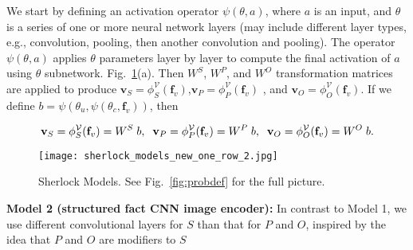 \documentclass[runningheads]{llncs}
\begin{document}
We start by defining an activation operator $\psi(\theta, a)$, where $a$ is an input, and $\theta$ is a series of one or more neural network layers (may include different layer types, e.g.,  convolution,  pooling, then another convolution and pooling). The operator $\psi(\theta, a)$ applies $\theta$  parameters layer by layer to compute the final activation of $a$ using $\theta$  subnetwork. %
Fig.~\ref{fig:mdls2}(a). 
Then $W^S$,  $W^P$, and $W^O$ transformation matrices are applied to produce $\mathbf{v}_S = \phi_S^\mathcal{V}(\mathbf{f}_v)$,$\mathbf{v}_P =\phi_P^\mathcal{V}(\mathbf{f}_v)$ , and $\mathbf{v}_O =\phi_O^\mathcal{V}(\mathbf{f}_v)$. If we define $b = \psi( \theta_u, \psi(\theta_c, \mathbf{f}_v))$, then 
\begin{comment}
\begin{equation}
\small
\begin{split}
&\phi_S^\mathcal{V}(\mathbf{f}_v) =  W^S \psi( \theta_u, \psi(\theta_c, \mathbf{f}_v)),  
\phi_P^\mathcal{V}(\mathbf{f}_v) =  W^P\psi( \theta_u, \psi(\theta_c, \mathbf{f}_v)), \\ &  
\phi_O^\mathcal{V}(\mathbf{f}_v) =  W^O\psi( \theta_u, \psi(\theta_c, \mathbf{f}_v))
\end{split}
\label{eq_mdl1}
\end{equation}
\begin{equation}
\small
b = \psi( \theta_v^u, \psi(\theta_v^c, \mathbf{f}_v)), \;\;
 \phi_S^\mathcal{V}(\mathbf{f}_v) =  W_v^S \; b,  \;\;
\phi_P^\mathcal{V}(\mathbf{f}_v) =  W_v^P \; b,   \;\;
\phi_O^\mathcal{V}(\mathbf{f}_v) =  W_v^O \; b.
\label{eq_mdl1}
\end{equation}
\end{comment}\begin{equation}
\small
\mathbf{v}_S = \phi_S^\mathcal{V}(\mathbf{f}_v) =  W^S \; b,  \;\;
\mathbf{v}_P= \phi_P^\mathcal{V}(\mathbf{f}_v) =  W^P \; b,   \;\;
\mathbf{v}_O= \phi_O^\mathcal{V}(\mathbf{f}_v) =  W^O \; b.
\label{eq_mdl1}
\end{equation}\begin{figure}[t!]
\begin{center}
\vspace{-10mm}
 \texttt{[image: sherlock\_models\_new\_one\_row\_2.jpg]}
\end{center}
 \vspace{-4mm}
 \caption{Sherlock Models. See Fig.~\ref{fig:probdef} for the full picture.} 
 \vspace{-5mm}
\label{fig:mdls2}
\end{figure}\vspace{-1mm}\noindent\textbf{Model 2 (structured fact CNN image encoder): } In contrast to Model 1, we use different convolutional layers for $S$ than that for $P$ and $O$, inspired by the idea that $P$ and $O$ are modifiers to $S$%
\end{document}
